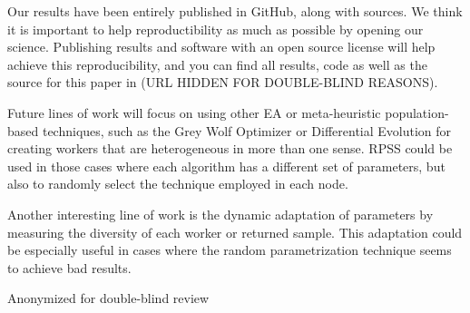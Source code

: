 Our results have been entirely published in GitHub, along with
sources. We think it is important to help reproductibility as much as
possible by opening our science. Publishing results and software with
an open source license will help achieve this reproducibility, and you
can find all results, code as well as the source for this paper in
(URL HIDDEN FOR DOUBLE-BLIND REASONS).

Future lines of work will focus on using other EA or 
meta-heuristic population-based techniques, such as the Grey Wolf Optimizer \cite{mirjalili2014grey}
or Differential Evolution \cite{storn1997differential} for creating workers that are 
heterogeneous in more than one sense. RPSS could be used 
in those cases where each algorithm has a different set of 
parameters, but also to randomly select the technique employed 
in each node.

Another interesting line of work is the dynamic 
adaptation of parameters by measuring the diversity of each 
worker or returned sample. This adaptation could be especially 
useful in cases where the random parametrization technique 
seems to achieve bad results. 

\begin{acks}
  Anonymized for double-blind review
\end{acks}
